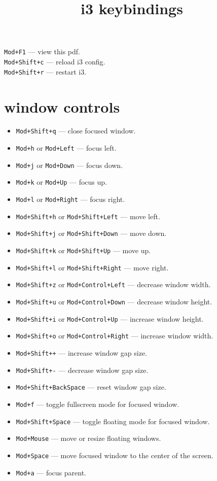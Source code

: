 \documentclass{article}
\title{i3 keybindings}
\author{}
\date{}
\begin{document}
\maketitle

\noindent
\texttt{Mod+F1} --- view this pdf. \\
\texttt{Mod+Shift+c} --- reload i3 config. \\
\texttt{Mod+Shift+r} --- restart i3.

\section*{window controls}

\vspace*{-.5\baselineskip}
\begin{itemize}
  \item \texttt{Mod+Shift+q} --- close focused window.
  \item \texttt{Mod+h} or \texttt{Mod+Left} --- focus left.
  \item \texttt{Mod+j} or \texttt{Mod+Down} --- focus down.
  \item \texttt{Mod+k} or \texttt{Mod+Up} --- focus up.
  \item \texttt{Mod+l} or \texttt{Mod+Right} --- focus right.
  \item \texttt{Mod+Shift+h} or \texttt{Mod+Shift+Left} --- move left.
  \item \texttt{Mod+Shift+j} or \texttt{Mod+Shift+Down} --- move down.
  \item \texttt{Mod+Shift+k} or \texttt{Mod+Shift+Up} --- move up.
  \item \texttt{Mod+Shift+l} or \texttt{Mod+Shift+Right} --- move right.
  \item \texttt{Mod+Shift+z} or \texttt{Mod+Control+Left} --- decrease window width.
  \item \texttt{Mod+Shift+u} or \texttt{Mod+Control+Down} --- decrease window height.
  \item \texttt{Mod+Shift+i} or \texttt{Mod+Control+Up} --- increase window height.
  \item \texttt{Mod+Shift+o} or \texttt{Mod+Control+Right} --- increase window width.
  \item \texttt{Mod+Shift{\small+}+} --- increase window gap size.
  \item \texttt{Mod+Shift{\small+}-} --- decrease window gap size.
  \item \texttt{Mod+Shift+BackSpace} --- reset window gap size.
  \item \texttt{Mod+f} --- toggle fullscreen mode for focused window.
  \item \texttt{Mod+Shift+Space} --- toggle floating mode for focused window.
  \item \texttt{Mod+Mouse} --- move or resize floating windows.
  \item \texttt{Mod+Space} --- move focused window to the center of the screen.
  \item \texttt{Mod+a} --- focus parent.
\end{itemize}
\end{document}
